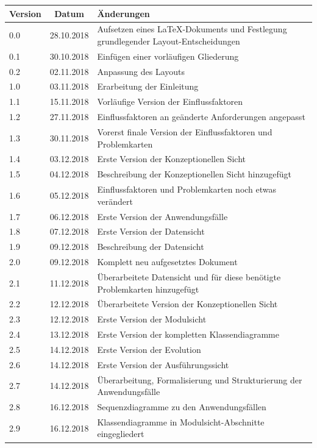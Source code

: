 \documentclass[enabledeprecatedfontcommands,fontsize=11pt,paper=a4,twoside]{scrartcl}
\newcounter{one}
\begin{document}
	\begin{tabular}{p{}cp{12cm}}
		Version & Datum & Änderungen \\
		\hline
		0.0 & 28.10.2018 & Aufsetzen eines LaTeX-Dokuments und Festlegung grundlegender Layout-Entscheidungen \\
		0.1 & 30.10.2018 & Einfügen einer vorläufigen Gliederung \\
		0.2 & 02.11.2018 & Anpassung des Layouts \\
		1.0 & 03.11.2018 & Erarbeitung der Einleitung \\
		1.1 & 15.11.2018 & Vorläufige Version der Einflussfaktoren \\
		1.2 & 27.11.2018 & Einflussfaktoren an geänderte Anforderungen angepasst \\
		1.3 & 30.11.2018 & Vorerst finale Version der Einflussfaktoren und Problemkarten  \\
		1.4 & 03.12.2018 & Erste Version der Konzeptionellen Sicht\\
		1.5 & 04.12.2018 & Beschreibung der Konzeptionellen Sicht hinzugefügt\\
		1.6 & 05.12.2018 & Einflussfaktoren und Problemkarten noch etwas verändert \\
		1.7 & 06.12.2018 & Erste Version der Anwendungsfälle \\
		1.8 & 07.12.2018 & Erste Version der Datensicht \\
		1.9 & 09.12.2018 & Beschreibung der Datensicht \\
		2.0 & 09.12.2018 & Komplett neu aufgesetztes Dokument \\
		2.1 & 11.12.2018 & Überarbeitete Datensicht und für diese benötigte Problemkarten hinzugefügt\\
		2.2 & 12.12.2018 & Überarbeitete Version der Konzeptionellen Sicht \\
		2.3 & 12.12.2018 & Erste Version der Modulsicht \\
		2.4 & 13.12.2018 & Erste Version der kompletten Klassendiagramme \\
		2.5 & 14.12.2018 & Erste Version der Evolution \\
		2.6 & 14.12.2018 & Erste Version der Ausführungssicht \\
		2.7 & 14.12.2018 & Überarbeitung, Formalisierung und Strukturierung der Anwendungsfälle \\
		2.8 & 16.12.2018 & Sequenzdiagramme zu den Anwendungsfällen \\
		2.9 & 16.12.2018 & Klassendiagramme in Modulsicht-Abschnitte eingegliedert \\

\end{tabular}
\end{document}

